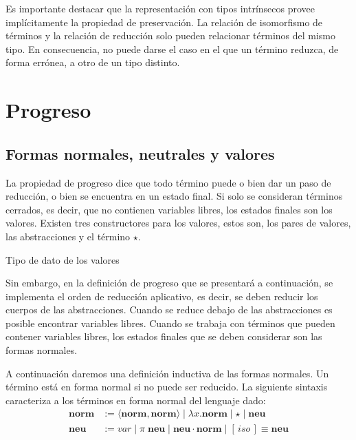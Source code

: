 Es importante destacar que la representación con tipos intrínsecos provee implícitamente la propiedad de preservación.
La relación de isomorfismo de términos \type{$\_\rightleftarrows\_$} y la relación de reducción \type{$\_\hookrightarrow\_$} solo pueden relacionar términos del mismo tipo. 
En consecuencia, no puede darse el caso en el que un término reduzca, de forma errónea, a otro de un tipo distinto.


\section{Progreso}

\subsection{Formas normales, neutrales y valores}

La propiedad de progreso dice que todo término puede o bien dar un paso de reducción, o bien se encuentra en un estado final.
Si solo se consideran términos cerrados, es decir, que no contienen variables libres, los estados finales son los valores.
Existen tres constructores para los valores, estos son, los pares de valores, las abstracciones y el término $\star$.

\begin{codigo}
	Tipo de dato de los valores
\end{codigo}

Sin embargo, en la definición de progreso que se presentará a continuación, se implementa el orden de reducción aplicativo, es decir, se deben reducir los cuerpos de las abstracciones.
Cuando se reduce debajo de las abstracciones es posible encontrar variables libres.
Cuando se trabaja con términos que pueden contener variables libres, los estados finales que se deben considerar son las formas normales.

A continuación daremos una definición inductiva de las formas normales. Un término está en forma normal si no puede ser reducido. La siguiente sintaxis caracteriza a los términos en forma normal del lenguaje dado: 
\begin{align*}
	\textbf{norm} &:= \langle \textbf{norm}, \textbf{norm} \rangle \mid \lambda x. \textbf{norm} \mid \star \mid \textbf{neu} \\
	\textbf{neu} &:= var \mid \pi\; \textbf{neu} \mid \textbf{neu} \cdot \textbf{norm} \mid [\, iso \,]\!\!\equiv \textbf{neu}
\end{align*}

